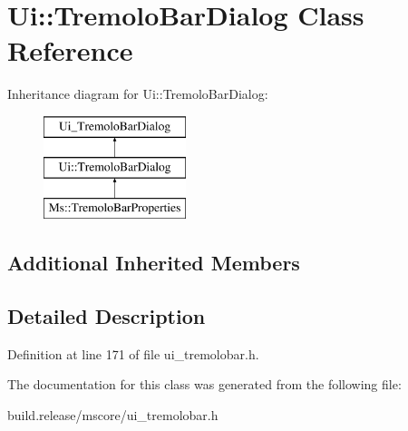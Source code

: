 \hypertarget{class_ui_1_1_tremolo_bar_dialog}{}\section{Ui\+:\+:Tremolo\+Bar\+Dialog Class Reference}
\label{class_ui_1_1_tremolo_bar_dialog}
Inheritance diagram for Ui\+:\+:Tremolo\+Bar\+Dialog\+:\begin{figure}[H]
\begin{center}
\leavevmode
\includegraphics[height=3.000000cm]{class_ui_1_1_tremolo_bar_dialog}
\end{center}
\end{figure}
\subsection*{Additional Inherited Members}


\subsection{Detailed Description}


Definition at line 171 of file ui\+\_\+tremolobar.\+h.



The documentation for this class was generated from the following file\+:\begin{DoxyCompactItemize}
\item 
build.\+release/mscore/ui\+\_\+tremolobar.\+h\end{DoxyCompactItemize}
